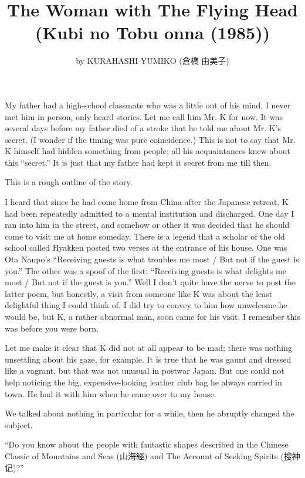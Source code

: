 \documentclass[a6paper]{article}
\begin{document}
	
\title{The Woman with The Flying Head \\
{ \small (Kubi no Tobu onna (1985))}
}
\author{by KURAHASHI YUMIKO (倉橋 由美子)}
\date{}

\large
\maketitle

My father had a high-school classmate who was a little
out of his mind.  I never met him in person, only heard
stories.  Let me call him Mr.  K for now.  It was several
days before my father died of a stroke that he told me
about Mr. K's secret.  (I wonder if the timing was pure
coincidence.)  This is not to say that Mr. K himself had
hidden something from people; all his acquaintances knew
about this “secret.”  It is just that my father had kept it
secret from me till then.

This is a rough outline of the story.

I heard that since he had come home from China after the
Japanese retreat, K had been repeatedly admitted to a
mental institution and discharged.  One day I ran into him in the
street, and somehow or other it was decided that he should
come to visit me at home someday.  There is a legend that a
scholar of the old school called Hyakken posted two verses
at the entrance of his house.  One was Ota Nanpo's “Receiving
guests is what troubles me most / But not if the guest is
you.”  The other was a spoof of the ﬁrst: “Receiving guests
is what delights me most / But not if the guest is you.”
Well I don't quite have the nerve to post the latter poem,
but honestly, a visit from someone like K was about the
least delightful thing I could think of.  I did try to convey to
him how unwelcome he would be, but K, a rather abnormal
man, soon came for his visit.  I remember this was before
you were born.

Let me make it clear that K did not at all appear to be
mad;  there was nothing unsettling about his gaze, for
example.  It is true that he was gaunt and dressed like a vagrant,
but that was not unusual in postwar Japan.  But one could
not help noticing the big, expensive-looking leather club
bag he always carried in town.  He had it with him when he
came over to my house.

We talked about nothing in particular for a while, then he
abruptly changed the subject.

“Do you know about the people with fantastic shapes
described in the Chinese Classic of Mountains and Seas (山海經)
and The Account of Seeking Spirits (搜神记)?”
\end{document}
